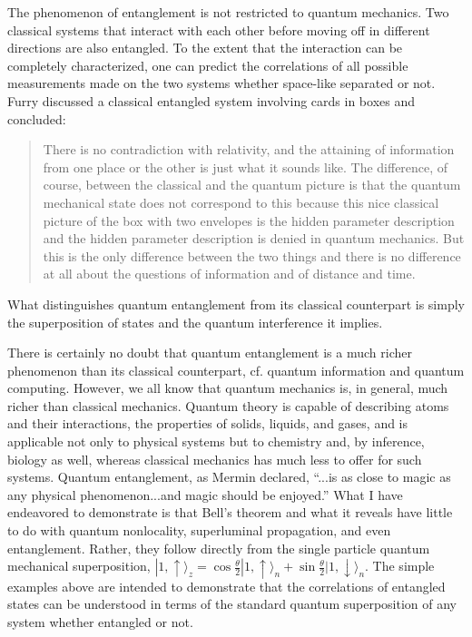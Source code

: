 \documentclass[12pt]{article}
\begin{document}
The phenomenon of entanglement is not restricted to quantum mechanics.  Two classical systems that interact with each other before moving off in different directions are also entangled.  To the extent that the interaction can be completely characterized, one can predict the correlations of all possible measurements made on the two systems whether space-like separated or not. Furry discussed a classical entangled system involving cards in boxes and concluded\cite{Fur62}:
\begin{quote}
There is no contradiction with relativity, and the attaining of information from one place or the other is just what it sounds like. The difference, of course, between the classical and the quantum picture is that the quantum mechanical state does not correspond to this because this nice classical picture of the box with two envelopes is the hidden parameter description and the hidden parameter description is denied in quantum mechanics. But this is the only difference between the two things and there is no difference at all about the questions of information and of distance and time.
\end{quote}
What distinguishes quantum entanglement from its classical counterpart is simply the superposition of states and the quantum interference it implies.

There is certainly no doubt that quantum entanglement is a much richer phenomenon than its classical counterpart, cf. quantum information and quantum computing.  However, we all know that quantum mechanics is, in general, much richer than classical mechanics.  Quantum theory is capable of describing atoms and their interactions, the properties of solids, liquids, and gases, and is applicable not only to physical systems but to chemistry and, by inference, biology as well, whereas classical mechanics has much less to offer for such systems. Quantum entanglement, as Mermin declared\cite{Mer85}, ``...is as close to magic as any physical phenomenon...and magic should be enjoyed.''  What I have endeavored to demonstrate is that Bell's theorem and what it reveals have little to do with quantum nonlocality, superluminal propagation, and even entanglement.  Rather, they follow directly from the single particle quantum mechanical superposition, $|1,\uparrow \rangle_z = \cos{\frac{\theta}{2}} |1,\uparrow \rangle_n + \sin{\frac{\theta}{2}} |1,\downarrow \rangle_n$.  The simple examples above are intended to demonstrate that the correlations of entangled states can be understood in terms of the standard quantum superposition of any system whether entangled or not.
\end{document}
